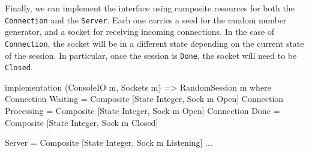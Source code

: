 Finally, we can implement the interface using composite resources for both
the \texttt{Connection} and the \texttt{Server}. Each one carries a seed
for the random number generator, and a socket for receiving incoming
connections. In the case of \texttt{Connection}, the socket will be in a
different state depending on the current state of the session. In
particular, once the session is \texttt{Done}, the socket will need to be
\texttt{Closed}.

\small
\begin{code}
implementation (ConsoleIO m, Sockets m) => RandomSession m where
  Connection Waiting = Composite [State Integer, Sock {m} Open]
  Connection Processing = Composite [State Integer, Sock {m} Open]
  Connection Done = Composite [State Integer, Sock {m} Closed]

  Server = Composite [State Integer, Sock {m} Listening]
  ...
\end{code}
\normalsize

